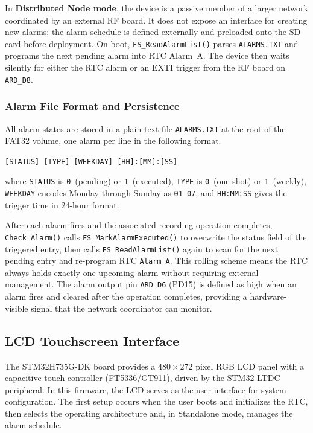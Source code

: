 In \textbf{Distributed Node mode}, the device is a passive member of a larger network coordinated by an external RF board. It does not expose an interface for creating new alarms; the alarm schedule is defined externally and preloaded onto the SD card before deployment. On boot, \texttt{FS\_ReadAlarmList()} parses \texttt{ALARMS.TXT} and programs the next pending alarm into RTC Alarm~A. The device then waits silently for either the RTC alarm or an EXTI trigger from the RF board on \texttt{ARD\_D8}.

\subsubsection{Alarm File Format and Persistence}

All alarm states are stored in a plain-text file \texttt{ALARMS.TXT} at the root of the FAT32 volume, one alarm per line in the following format.

\begin{center}
\texttt{[STATUS] [TYPE] [WEEKDAY] [HH]:[MM]:[SS]}
\end{center}

\noindent where \texttt{STATUS} is \texttt{0}~(pending) or \texttt{1}~(executed), \texttt{TYPE} is \texttt{0}~(one-shot) or \texttt{1}~(weekly), \texttt{WEEKDAY} encodes Monday through Sunday as \texttt{01}--\texttt{07}, and \texttt{HH:MM:SS} gives the trigger time in 24-hour format.

After each alarm fires and the associated recording operation completes, \linebreak  \texttt{Check\_Alarm()} calls \texttt{FS\_MarkAlarmExecuted()} to overwrite the status field of the triggered entry, then calls \texttt{FS\_ReadAlarmList()} again to scan for the next pending entry and re-program RTC \texttt{Alarm A}. This rolling scheme means the RTC always holds exactly one upcoming alarm without requiring external management. The alarm output pin \texttt{ARD\_D6} (PD15) is defined as high when an alarm fires and cleared after the operation completes, providing a hardware-visible signal that the network coordinator can monitor.

\subsection{LCD Touchscreen Interface}
\label{sec:lcd}

The STM32H735G-DK board provides a $480\times272$ pixel RGB LCD panel with a capacitive touch controller (FT5336/GT911), driven by the STM32 LTDC peripheral. In this firmware, the LCD serves as the user interface for system configuration. The first setup occurs when the user boots and initializes the RTC, then selects the operating architecture and, in Standalone mode, manages the alarm schedule.

